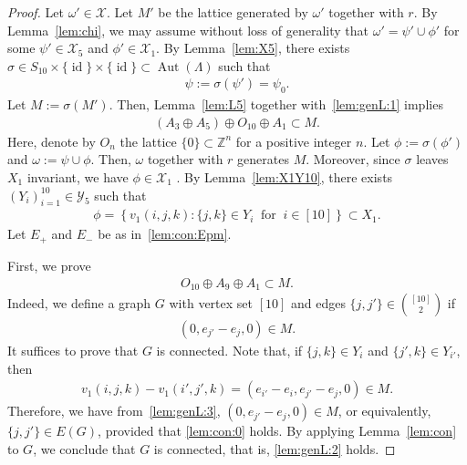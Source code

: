 \documentclass[10pt,a4paper]{amsart}
\DeclareMathOperator{\Aut}{Aut}
\DeclareMathOperator{\id}{id}
\newcommand{\Z}{\mathbb{Z}}
\newcommand{\aesf}{\psi}
\newcommand{\aeso}{\phi}
\newcommand{\aes}{\omega}
\newcommand{\cX}{\mathcal{X}}
\newcommand{\cY}{\mathcal{Y}}
\begin{document}
\begin{proof}
	Let $\aes' \in \cX$.
	Let $M'$ be the lattice generated by $\aes'$ together with $r$.
	By Lemma~\ref{lem:chi}, we may assume without loss of generality that
	$\aes' = \aesf' \cup \aeso'$ for some
	$\aesf' \in \cX_5$ and $\aeso' \in \cX_1$.
	By Lemma~\ref{lem:X5}, there exists $\sigma \in S_{10}\times\{\id \}\times\{ \id \}\subset
		\Aut(\Lambda)$ such that
	\begin{align}	\label{lem:genL:1}
		\aesf := \sigma(\aesf') = \psi_0.
	\end{align}
	Let $M:=\sigma(M')$. Then,
	Lemma~\ref{lem:L5} together with~\eqref{lem:genL:1} implies
	\begin{align} \label{lem:genL:3}
		(A_3 \oplus A_5 ) \oplus O_{10} \oplus A_1  \subset M.
	\end{align}
	Here, denote by $O_n$ the lattice $\{ 0 \} \subset \Z^n$ for a positive integer $n$.
	Let $\aeso := \sigma(\aeso')$ and $\aes:=\aesf\cup\aeso$.
	Then, $\aes$ together with $r$ generates $M$.
	Moreover, since $\sigma$ leaves $X_1$ invariant, we have $\aeso \in \cX_1$ .
	By Lemma~\ref{lem:X1Y10}, there exists $(Y_i)_{i=1}^{10} \in \cY_{5}$ such that
	\begin{align} \label{lem:genL:4}
		\aeso = \left\{ v_1(i,j,k) : \{j,k\} \in Y_i \ \text{ for }\  i \in [10] \right\} \subset X_1.
	\end{align}
	Let $E_+$ and $E_-$ be as in~\eqref{lem:con:Epm}.

	First, we prove
	\begin{align} \label{lem:genL:2}
		O_{10} \oplus A_9 \oplus A_1 \subset M.
	\end{align}
	Indeed, we define a graph $G$ with vertex set $[10]$ and edges $\{j, j'\} \in \binom{[10]}{2}$ if
	\begin{align}	\label{lem:genL:6}
		(0,e_{j'}-e_j,0) \in M.
	\end{align}
	It suffices to prove that $G$ is connected.
	Note that, if $\{j,k\}\in Y_i$ and $\{j',k\}\in Y_{i'}$, then
	\begin{align}	\label{lem:genL:5}
		v_1(i,j,k)-v_1(i',j',k) = (e_{i'}-e_i, e_{j'}-e_j , 0) \in M.
	\end{align}
	Therefore, we have from~\eqref{lem:genL:3},
	$(0,e_{j'}-e_j,0) \in M$, or equivalently, $\{j,j'\} \in E(G)$,
	provided that \eqref{lem:con:0} holds.
	By applying Lemma~\ref{lem:con} to $G$, we conclude that $G$ is connected, that is, \eqref{lem:genL:2} holds.


\end{proof}
\end{document}

